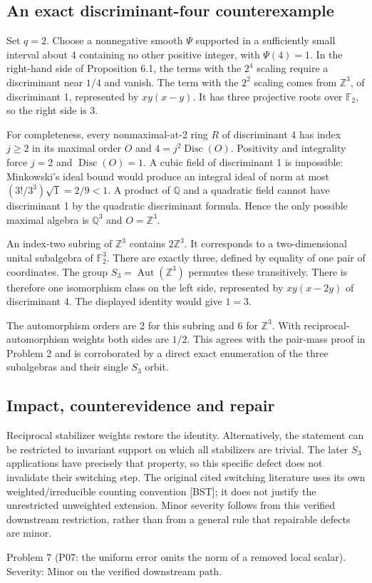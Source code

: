 \documentclass[10pt]{article}
\begin{document}
\subsection*{An exact discriminant-four counterexample}
Set \(q=2\). Choose a nonnegative smooth \(\Psi\) supported in a sufficiently small interval about 4 containing no other positive integer, with \(\Psi(4)=1\). In the right-hand side of Proposition 6.1, the terms with the \(2^4\) scaling require a discriminant near \(1/4\) and vanish. The term with the \(2^2\) scaling comes from \(\mathbb Z^3\), of discriminant 1, represented by \(xy(x-y)\). It has three projective roots over \(\mathbb F_2\), so the right side is 3.\par
For completeness, every nonmaximal-at-2 ring \(R\) of discriminant 4 has index \(j\ge2\) in its maximal order \(O\) and \(4=j^2\operatorname{Disc}(O)\). Positivity and integrality force \(j=2\) and \(\operatorname{Disc}(O)=1\). A cubic field of discriminant 1 is impossible: Minkowski’s ideal bound would produce an integral ideal of norm at most \((3!/3^3)\sqrt1=2/9<1\). A product of \(\mathbb Q\) and a quadratic field cannot have discriminant 1 by the quadratic discriminant formula. Hence the only possible maximal algebra is \(\mathbb Q^3\) and \(O=\mathbb Z^3\).\par
An index-two subring of \(\mathbb Z^3\) contains \(2\mathbb Z^3\). It corresponds to a two-dimensional unital subalgebra of \(\mathbb F_2^3\). There are exactly three, defined by equality of one pair of coordinates. The group \(S_3=\operatorname{Aut}(\mathbb Z^3)\) permutes these transitively. There is therefore one isomorphism class on the left side, represented by \(xy(x-2y)\) of discriminant 4. The displayed identity would give \(1=3\).\par
The automorphism orders are 2 for this subring and 6 for \(\mathbb Z^3\). With reciprocal-automorphism weights both sides are \(1/2\). This agrees with the pair-mass proof in Problem 2 and is corroborated by a direct exact enumeration of the three subalgebras and their single \(S_3\) orbit.\par
\subsection*{Impact, counterevidence and repair}
Reciprocal stabilizer weights restore the identity. Alternatively, the statement can be restricted to invariant support on which all stabilizers are trivial. The later \(S_3\) applications have precisely that property, so this specific defect does not invalidate their switching step. The original cited switching literature uses its own weighted/irreducible counting convention [BST]; it does not justify the unrestricted unweighted extension. Minor severity follows from this verified downstream restriction, rather than from a general rule that repairable defects are minor.\par
Problem 7 (P07: the uniform error omits the norm of a removed local scalar).  Severity: Minor on the verified downstream path.\par
\end{document}
